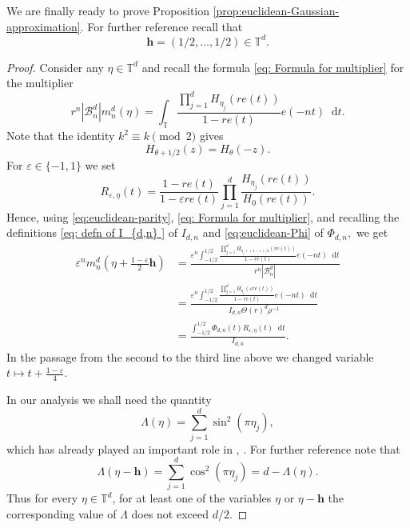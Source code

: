 \documentclass{article}
\newcommand{\T}{\mathbb T}
\newcommand{\dd}{\mathop{}\!\mathrm{d}}
\theoremstyle{plain}
\numberwithin{equation}{section}
\begin{document}
We are finally ready to prove Proposition \ref{prop:euclidean-Gaussian-approximation}. For further reference recall that
\[
\mathbf{h}= (1/2,\ldots,1/2) \in \T^d.
\]
\begin{proof}
    Consider any $\eta \in \T^d$ and recall the formula \eqref{eq: Formula for multiplier} for the multiplier 
    \[
    r^n|\mathcal{B}_n^{d}| m_n^d(\eta)= \int_\T \frac{\prod_{j=1}^d H_{\eta_j}(re(t))}{1-re(t)} e(-nt) \dd t.
    \]
Note that the identity \(k^2\equiv k\pmod 2\) gives
\begin{equation}\label{eq:euclidean-parity}
 H_{\theta+1/2}(z)=H_\theta(-z).
\end{equation}
For \(\varepsilon\in\{-1,1\}\) we set
\begin{equation*}
 R_{\varepsilon,\eta}(t)
 =
 \frac{1-re(t)}{1-\varepsilon re(t)}
 \prod_{j=1}^d
 \frac{H_{\eta_j}(re(t))}{H_0(re(t))}.
\end{equation*}
Hence, using \eqref{eq:euclidean-parity}, \eqref{eq: Formula for multiplier}, and recalling the definitions \eqref{eq: defn of I_{d,n} } of $I_{d,n}$ and \eqref{eq:euclidean-Phi} of $\Phi_{d,n},$ we get
\begin{equation}
\label{eq:euclidean-Cauchy-quotient}
\begin{split}
 \varepsilon^n m_n^d\left(\eta+\frac{1-\varepsilon}{2}\mathbf h\right)
 &=
 \frac{\displaystyle
  \varepsilon^n\int_{-1/2}^{1/2}
 \frac{\prod_{j=1}^d H_{\eta_j+(1-\varepsilon)/4}(re(t))}{1-re(t)} e(-nt)\dd t}
 {r^n|\mathcal{B}_{n}^d|} \\
 &=\frac{\displaystyle
  \varepsilon^n\int_{-1/2}^{1/2}
 \frac{\prod_{j=1}^d H_{\eta_j}(\varepsilon re(t))}{1-re(t)} e(-nt)\dd t}
 {I_{d,n} \Theta(r)^d \rho^{-1}} \\
 &= \frac{\displaystyle
  \int_{-1/2}^{1/2}
 \Phi_{d,n}(t) R_{\varepsilon,\eta}(t) \dd t}
 {I_{d,n}}.
\end{split}
\end{equation}
In the passage from the second to the third line above we changed variable $t \mapsto t+\frac{1-\varepsilon}{4}$. 

In our analysis we shall need the quantity
\[
 \Lambda(\eta)
 =
 \sum_{j=1}^d\sin^2(\pi\eta_j),
\]
which has already played an important role in \cite{BMSWballs}, \cite{NiksinskiWrobel}.
For further reference note that 
\begin{equation*}
 \Lambda(\eta-\mathbf h)
 =\sum_{j=1}^d \cos^2(\pi\eta_j)=
 d-\Lambda(\eta).
\end{equation*}
Thus for every \(\eta \in \T^d\), for at least one of the variables \(\eta\) or
\(\eta-\mathbf h\) the corresponding value of \(\Lambda\) does not exceed $d/2$.  


\end{proof}
\end{document}
